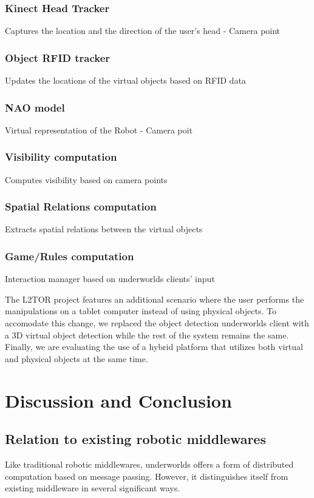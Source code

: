 \documentclass[letterpaper, 10 pt, conference]{ieeeconf}  %
\newcommand{\uwds}{{\sc underworlds}\xspace}
\begin{document}
\subsubsection{Kinect Head Tracker} {Captures the location and the direction of the user's head - Camera point}
\subsubsection{Object RFID tracker} {Updates the locations of the virtual objects based on RFID data}
\subsubsection{NAO model}{Virtual representation of the Robot - Camera poit}
\subsubsection{Visibility computation}{Computes visibility based on camera points}
\subsubsection{Spatial Relations computation}{Extracts spatial relations between the virtual objects}
\subsubsection{Game/Rules computation}{Interaction manager based on \uwds clients' input}

The L2TOR project features an additional scenario where the user performs the manipulations on a tablet computer instead of using physical objects. To accomodate this change, we replaced the object detection \uwds client with a 3D virtual object detection while the rest of the system remains the same. Finally, we are evaluating the use of a hybrid platform that utilizes both virtual and physical objects at the same time. 


\section{Discussion and Conclusion}

\subsection{Relation to existing robotic middlewares}

Like traditional robotic middlewares, \uwds offers a form of distributed
computation based on message passing. However, it distinguishes itself from
existing middleware in several significant ways.
\end{document}
